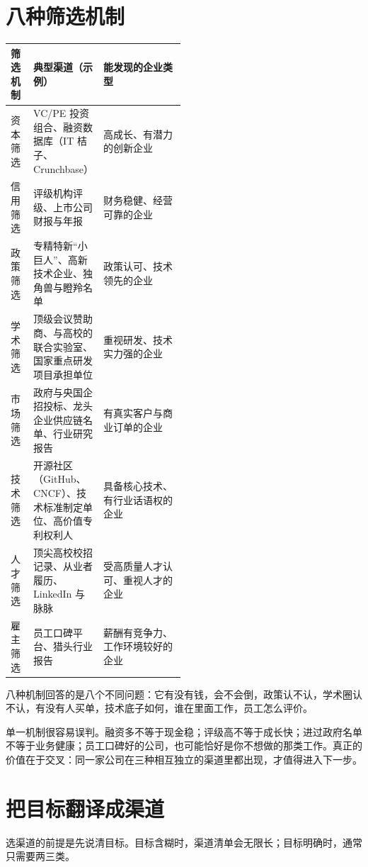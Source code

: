 \documentclass[UTF8,zihao=5,openany]{ctexbook}
\begin{document}
\section{八种筛选机制}
\begin{center}\small
\begin{tabularx}{\linewidth}{p{0.13\linewidth}p{0.36\linewidth}Y}
\toprule
筛选机制 & 典型渠道（示例） & 能发现的企业类型 \\
\midrule
资本筛选 & VC/PE 投资组合、融资数据库（IT 桔子、Crunchbase） & 高成长、有潜力的创新企业 \\
信用筛选 & 评级机构评级、上市公司财报与年报 & 财务稳健、经营可靠的企业 \\
政策筛选 & 专精特新“小巨人”、高新技术企业、独角兽与瞪羚名单 & 政策认可、技术领先的企业 \\
学术筛选 & 顶级会议赞助商、与高校的联合实验室、国家重点研发项目承担单位 & 重视研发、技术实力强的企业 \\
市场筛选 & 政府与央国企招投标、龙头企业供应链名单、行业研究报告 & 有真实客户与商业订单的企业 \\
技术筛选 & 开源社区（GitHub、CNCF）、技术标准制定单位、高价值专利权利人 & 具备核心技术、有行业话语权的企业 \\
人才筛选 & 顶尖高校校招记录、从业者履历、LinkedIn 与脉脉 & 受高质量人才认可、重视人才的企业 \\
雇主筛选 & 员工口碑平台、猎头行业报告 & 薪酬有竞争力、工作环境较好的企业 \\
\bottomrule
\end{tabularx}
\end{center}

八种机制回答的是八个不同问题：它有没有钱，会不会倒，政策认不认，学术圈认不认，有没有人买单，技术底子如何，谁在里面工作，员工怎么评价。

单一机制很容易误判。融资多不等于现金稳；评级高不等于成长快；进过政府名单不等于业务健康；员工口碑好的公司，也可能恰好是你不想做的那类工作。真正的价值在于交叉：同一家公司在三种相互独立的渠道里都出现，才值得进入下一步。

\section{把目标翻译成渠道}
选渠道的前提是先说清目标。目标含糊时，渠道清单会无限长；目标明确时，通常只需要两三类。
\end{document}
